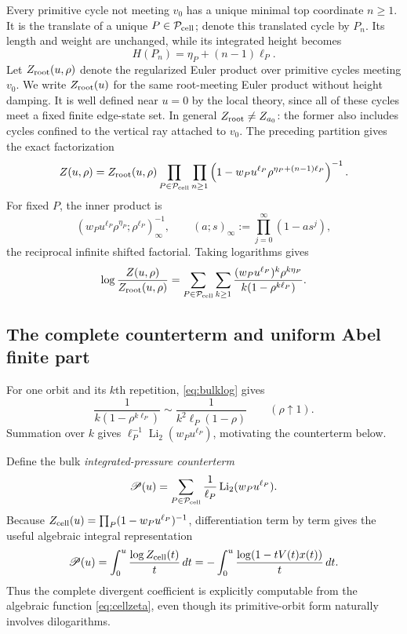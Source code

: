 \documentclass[11pt,reqno]{amsart}
\numberwithin{equation}{section}
\theoremstyle{definition}
\theoremstyle{remark}
\newcommand{\Li}{\operatorname{Li}_2}
\begin{document}
Every primitive cycle not meeting $v_0$ has a unique minimal top coordinate
$n\ge1$.  It is the translate of a unique $P\in\mathcal P_{\rm cell}$; denote
this translated cycle by $P_n$.  Its length and weight are unchanged, while
its integrated height becomes
\begin{equation}\label{eq:translatedheight}
 H(P_n)=\eta_P+(n-1)\ell_P.
\end{equation}
Let $Z_{\rm root}(u,\rho)$ denote the regularized Euler product over primitive
cycles meeting $v_0$.  We write $Z_{\rm root}(u)$ for the same root-meeting
Euler product without height damping.  It is well defined near $u=0$ by the
local theory, since all of these cycles meet a fixed finite edge-state set.
In general $Z_{\rm root}\ne Z_{a_0}$: the former also includes cycles confined
to the vertical ray attached to $v_0$.
The preceding partition gives the exact factorization
\begin{equation}\label{eq:primitivefactorization}
 Z(u,\rho)=Z_{\rm root}(u,\rho)
 \prod_{P\in\mathcal P_{\rm cell}}\prod_{n\ge1}
 \left(1-w_Pu^{\ell_P}
 \rho^{\eta_P+(n-1)\ell_P}\right)^{-1}.
\end{equation}
For fixed $P$, the inner product is
\[
 (w_Pu^{\ell_P}\rho^{\eta_P};\rho^{\ell_P})_\infty^{-1},
 \qquad
 (a;s)_\infty:=\prod_{j=0}^\infty(1-as^j),
\]
the reciprocal infinite shifted factorial.  Taking logarithms gives
\begin{equation}\label{eq:bulklog}
 \log\frac{Z(u,\rho)}{Z_{\rm root}(u,\rho)}
 =\sum_{P\in\mathcal P_{\rm cell}}\sum_{k\ge1}
 \frac{(w_Pu^{\ell_P})^k\rho^{k\eta_P}}
 {k(1-\rho^{k\ell_P})}.
\end{equation}

\subsection{The complete counterterm and uniform Abel finite part}

For one orbit and its $k$th repetition, \eqref{eq:bulklog} gives
\[
 \frac1{k(1-\rho^{k\ell_P})}
 \sim \frac1{k^2\ell_P(1-\rho)}
 \qquad(\rho\uparrow1).
\]
Summation over $k$ gives $\ell_P^{-1}\Li(w_Pu^{\ell_P})$, motivating the
counterterm below.

Define the bulk \emph{integrated-pressure counterterm}
\begin{equation}\label{eq:pressure-counterterm}
 \mathscr P(u)=\sum_{P\in\mathcal P_{\rm cell}}
 \frac1{\ell_P}\Li(w_Pu^{\ell_P}).
\end{equation}
Because
$Z_{\rm cell}(u)=\prod_P(1-w_Pu^{\ell_P})^{-1}$, differentiation term by
term gives the useful algebraic integral representation
\begin{equation}\label{eq:pressure-integral}
 \mathscr P(u)=\int_0^u\frac{\log Z_{\rm cell}(t)}t\,dt
 =-\int_0^u\frac{\log(1-tV(t)x(t))}t\,dt.
\end{equation}
Thus the complete divergent coefficient is explicitly computable from the
algebraic function \eqref{eq:cellzeta}, even though its primitive-orbit form
naturally involves dilogarithms.
\end{document}
